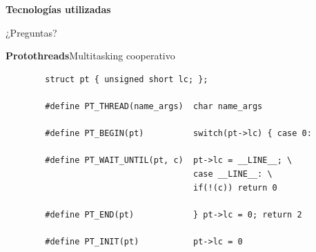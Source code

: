 \documentclass[11pt]{beamer}
\begin{document}
\begin{frame}{\textbf{\LARGE{Tecnologías utilizadas}}}
\fontsize{18pt}{18}\selectfont
\end{frame}


\begin{frame}[plain,c]
\begin{center}
\Huge ¿Preguntas?
\end{center}

\end{frame}


\begin{frame}[fragile]{\textbf{\LARGE{Protothreads}}}{Multitasking cooperativo}
	\vspace{-.7cm}
	\begin{verbatim}
		struct pt { unsigned short lc; };
		
		#define PT_THREAD(name_args)  char name_args

		#define PT_BEGIN(pt)          switch(pt->lc) { case 0:

		#define PT_WAIT_UNTIL(pt, c)  pt->lc = __LINE__; \
		                              case __LINE__: \
		                              if(!(c)) return 0

		#define PT_END(pt)            } pt->lc = 0; return 2

		#define PT_INIT(pt)           pt->lc = 0
	\end{verbatim}
\end{frame}
\end{document}
